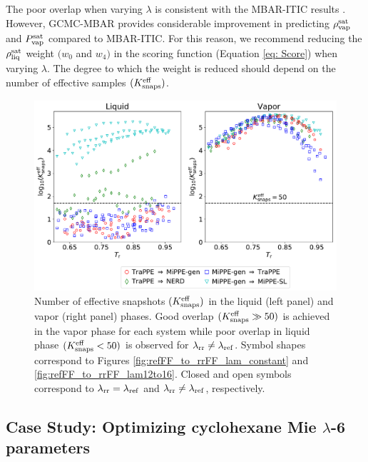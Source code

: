 \documentclass[journal=jced,manuscript=article]{achemso}
\begin{document}

The poor overlap when varying $\lambda$ is consistent with the MBAR-ITIC results \cite{Postdoc_1}. However, GCMC-MBAR provides considerable improvement in predicting $\rho_{\rm vap}^{\rm sat}$ and $P_{\rm vap}^{\rm sat}$ compared to MBAR-ITIC. For this reason, we recommend reducing the $\rho_{\rm liq}^{\rm sat}$ weight $(w_0$ and $w_4)$ in the scoring function (Equation \ref{eq: Score}) when varying $\lambda$. The degree to which the weight is reduced should depend on the number of effective samples $(K_{\rm snaps}^{\rm eff})$.

	\begin{figure}[htb!]
		\centering
		\includegraphics[width=6.4in]{refFF_to_rrFF_Neff_alt.pdf}
		\caption{Number of effective snapshots $(K_{\rm snaps}^{\rm eff})$ in the liquid (left panel) and vapor (right panel) phases. Good overlap $(K_{\rm snaps}^{\rm eff} \gg 50)$ is achieved in the vapor phase for each system while poor overlap in liquid phase $(K_{\rm snaps}^{\rm eff} < 50)$ is observed for $\lambda_{\rm rr} \neq \lambda_{\rm ref}$. Symbol shapes correspond to Figures \ref{fig:refFF_to_rrFF_lam_constant} and \ref{fig:refFF_to_rrFF_lam12to16}. Closed and open symbols correspond to $\lambda_{\rm rr} = \lambda_{\rm ref}$ and $\lambda_{\rm rr} \neq \lambda_{\rm ref}$, respectively.}
		\label{fig:Neff}
	\end{figure} 

\subsection{Case Study: Optimizing cyclohexane Mie $\lambda$-6 parameters}
\end{document}
